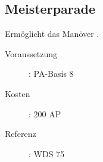 \subsection{Meisterparade}
\label{sf.meisterparade}
Ermöglicht das Manöver .
\begin{description}
    \item[Voraussetzung]:
        PA-Basis 8
    \item [Kosten]:
        200 AP
    \item [Referenz]:
        WDS 75
\end{description}
